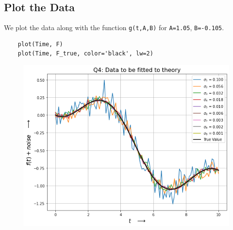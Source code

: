 \documentclass[12pt, a4paper]{article}
\begin{document}
\subsection{Plot the Data}
We plot the data along with the function \texttt{g(t,A,B)} for
\texttt{A=1.05}, \texttt{B=-0.105}.
\begin{verbatim}
    plot(Time, F)
    plot(Time, F_true, color='black', lw=2)
\end{verbatim}
\begin{figure}[H]
    \centering
    \includegraphics[scale=0.6]{Q4.png}
\end{figure}
\end{document}
